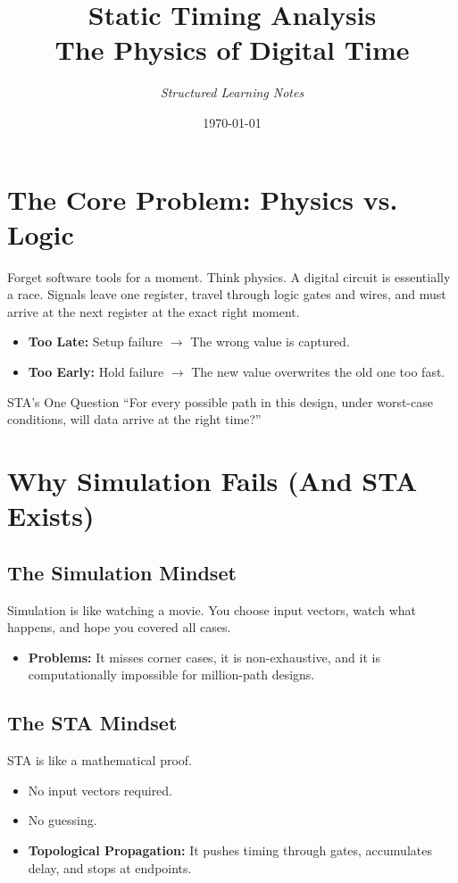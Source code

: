 \documentclass[11pt, a4paper]{article}
\title{\textbf{\Huge Static Timing Analysis}\\ \Large The Physics of Digital Time}
\author{\textit{Structured Learning Notes}}
\date{\today}
\begin{document}
\maketitle
\thispagestyle{empty}
\tableofcontents
\newpage

\section{The Core Problem: Physics vs. Logic}

Forget software tools for a moment. Think physics. A digital circuit is essentially a race. Signals leave one register, travel through logic gates and wires, and must arrive at the next register at the exact right moment.

\begin{itemize}
    \item \textbf{Too Late:} Setup failure $\rightarrow$ The wrong value is captured.
    \item \textbf{Too Early:} Hold failure $\rightarrow$ The new value overwrites the old one too fast.
\end{itemize}

\begin{mentalmodel}{STA's One Question}
``For every possible path in this design, under worst-case conditions, will data arrive at the right time?''
\end{mentalmodel}

\section{Why Simulation Fails (And STA Exists)}

\subsection{The Simulation Mindset}
Simulation is like watching a movie. You choose input vectors, watch what happens, and hope you covered all cases.
\begin{itemize}
    \item \textbf{Problems:} It misses corner cases, it is non-exhaustive, and it is computationally impossible for million-path designs.
\end{itemize}

\subsection{The STA Mindset}
STA is like a mathematical proof.
\begin{itemize}
    \item No input vectors required.
    \item No guessing.
    \item \textbf{Topological Propagation:} It pushes timing through gates, accumulates delay, and stops at endpoints.
\end{itemize}
\end{document}
